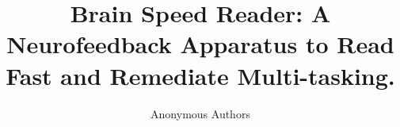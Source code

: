 \documentclass{sigchi}
\begin{document}
\title{Brain Speed Reader: A Neurofeedback Apparatus to Read Fast and Remediate Multi-tasking.}

\author{
  \alignauthor Anonymous Authors\\
    \\
    }


%
\maketitle















\end{document}
